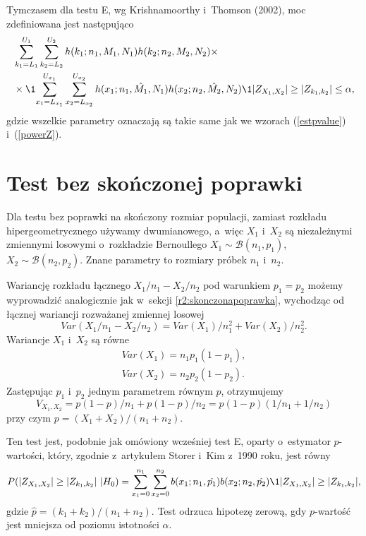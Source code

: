 Tymczasem dla testu E, wg Krishnamoorthy i~Thomson (2002), moc zdefiniowana jest następująco \cite{K.Krishnamoorthy2002}
\begin{equation}
\begin{split}
&\sum_{k_1=L_1}^{U_1}\sum_{k_2=L_2}^{U_2} h(k_1;n_1,M_1,N_1)h(k_2;n_2,M_2,N_2) \times \\
&\times \1{\sum_{x_1=L_{x_1}}^{U_{x_1}}\sum_{x_2=L_{x_2}}^{U_{x_2}} h(x_1;n_1,\hat{M_1},N_1)h(x_2;n_2,\hat{M_2},N_2) \1{|Z_{X_1,X_2}|\geq|Z_{k_1,k_2}|}\leq\alpha },
\end{split}
\end{equation}
gdzie wszelkie parametry oznaczają są takie same jak we wzorach (\ref{estpvalue}) i~(\ref{powerZ}).

\section{Test bez skończonej poprawki}
Dla testu bez poprawki na skończony rozmiar populacji, zamiast rozkładu hipergeometrycznego używamy dwumianowego, a~więc $X_1$ i~$X_2$ są niezależnymi zmiennymi losowymi o~rozkładzie Bernoullego $X_1\sim \mathcal{B}(n_1,p_1)$, $X_2\sim \mathcal{B}(n_2,p_2)$. Znane parametry to rozmiary próbek $n_1$ i~$n_2$.

Wariancję rozkładu łącznego $X_1/n_1-X_2/n_2$ pod warunkiem $p_1=p_2$ możemy wyprowadzić analogicznie jak w~sekcji \ref{r2:skonczonapoprawka}, wychodząc od łącznej wariancji rozważanej zmiennej losowej
\begin{equation}
Var(X_1/n_1-X_2/n_2) = Var(X_1)/n_1^2+Var(X_2)/n_2^2.
\end{equation}
Wariancje $X_1$ i~$X_2$ są równe
\begin{align}
Var(X_1)=n_1 p_1 (1-p_1),\\
Var(X_2)=n_2 p_2 (1-p_2).
\end{align}
Zastępując $p_1$ i~$p_2$ jednym parametrem równym $p$, otrzymujemy
\begin{equation}
V_{X_1,X_2} = p(1-p)/n_1 + p(1-p)/n_2 = p(1-p)(1/n_1+1/n_2)
\end{equation}
przy czym $p=(X_1+X_2)/(n_1+n_2)$.

Ten test jest, podobnie jak omówiony wcześniej test E, oparty o~estymator $p$-wartości, który, zgodnie z~artykułem Storer i~Kim z~1990 roku, jest równy \cite{Storer1990}
\begin{equation}
P(|Z_{X_1,X_2}|\geq|Z_{k_1,k_2}|\ |H_0) = \sum_{x_1=0}^{n_1}\sum_{x_2=0}^{n_2} b(x_1;n_1,\hat{p_1})b(x_2;n_2,\hat{p_2})\1{|Z_{X_1,X_2}|\geq|Z_{k_1,k_2}|},
\end{equation}
gdzie $\hat{p}=(k_1+k_2)/(n_1+n_2)$.
Test odrzuca hipotezę zerową, gdy $p$-wartość jest mniejsza od poziomu istotności $\alpha$.

